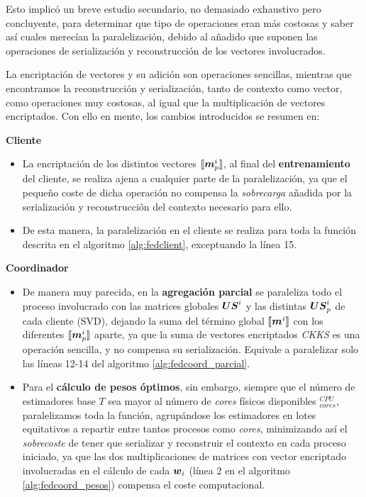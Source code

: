 \documentclass[00-Trabajo_Final.tex]{subfiles}
\begin{document}
\vspace{0.5em}

Esto implicó un breve estudio secundario, no demasiado exhaustivo pero concluyente, para determinar que tipo de operaciones eran más costosas y saber así cuales merecían la paralelización, debido al añadido que suponen las operaciones de serialización y reconstrucción de los vectores involucrados. 

La encriptación de vectores y su adición son operaciones sencillas, mientras que encontramos la reconstrucción y serialización, tanto de contexto como vector, como operaciones muy costosas, al igual que la multiplicación de vectores encriptados. Con ello en mente, los cambios introducidos se resumen en:

\vspace{0.5em}

\noindent \textbf{Cliente}
\begin{itemize}[topsep=5pt, itemsep=2pt]
    \item La encriptación de los distintos vectores $[\![\boldsymbol{m}_p^i]\!]$, al final del \textbf{entrenamiento} del cliente, se realiza ajena a cualquier parte de la paralelización, ya que el pequeño coste de dicha operación no compensa la \textit{sobrecarga} añadida por la serialización y reconstrucción del contexto necesario para ello.
    \item De esta manera, la paralelización en el cliente se realiza para toda la función descrita en el algoritmo \ref{alg:fedclient}, exceptuando la línea 15.
\end{itemize}

\noindent \textbf{Coordinador}
\begin{itemize}[topsep=5pt, itemsep=2pt]
    \item De manera muy parecida, en la \textbf{agregación parcial} se paraleliza todo el proceso involucrado con las matrices globales $\boldsymbol{US}^i$ y las distintas $\boldsymbol{US}_p^i$ de cada cliente (SVD), dejando la suma del término global $[\![\boldsymbol{m}^i]\!]$ con los diferentes $[\![\boldsymbol{m}_p^i]\!]$ aparte, ya que la suma de vectores encriptados \textit{CKKS} es una operación sencilla, y no compensa su serialización. Equivale a paralelizar solo las líneas 12-14 del algoritmo \ref{alg:fedcoord_parcial}.
    \item Para el \textbf{cálculo de pesos óptimos}, sin embargo, siempre que el número de estimadores base $T$ sea mayor al número de \textit{cores} físicos disponibles $_{cores}^{CPU}$, paralelizamos toda la función, agrupándose los estimadores en lotes equitativos a repartir entre tantos procesos como \textit{cores}, minimizando así el \textit{sobrecoste} de tener que serializar y reconstruir el contexto en cada proceso iniciado, ya que las dos multiplicaciones de matrices con vector encriptado involucradas en el cálculo de cada $\boldsymbol{w}_i$ (línea 2 en el algoritmo \ref{alg:fedcoord_pesos}) compensa el coste computacional.
\end{itemize}
\end{document}
